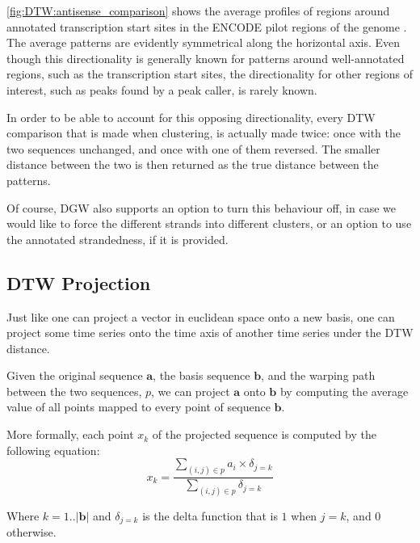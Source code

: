 \documentclass[parskip]{cs4rep}
\begin{document}
\autoref{fig:DTW:antisense_comparison} shows the average profiles of regions around annotated transcription start sites in the ENCODE pilot regions of the genome \cite{ENCODEProjectConsortium:2007fu}. The average patterns are evidently symmetrical along the horizontal axis.
Even though this directionality is generally known for patterns around well-annotated regions, such as the transcription start sites, the directionality for other regions of interest, such as peaks found by a peak caller, is rarely known.  

In order to be able to account for this opposing directionality, every DTW comparison that is made when clustering, is actually made twice: once with the two sequences unchanged, and once with one of them reversed. The smaller distance between the two is then returned as the true distance between the patterns. 

Of course, DGW also supports an option to turn this behaviour off, in case we would like to force the different strands into different clusters, or an option to use the annotated strandedness, if it is provided.

\subsection{DTW Projection}
\label{sec:dtw-projection}

Just like one can project a vector in euclidean space onto a new basis, one can project some time series onto the time axis of another time series under the DTW distance.

Given the original sequence $\mathbf{a}$, the basis sequence $\mathbf{b}$, and the warping path between the two sequences, $p$, we can project $\mathbf{a}$ onto $\mathbf{b}$ by computing the average value of all points mapped to every point of sequence $\mathbf{b}$.

More formally, each point $x_k$ of the projected sequence is computed by the following equation:
\begin{equation}
    x_k =  \frac{\sum_{(i,j) \in p} a_i \times \delta_{j=k}}{\sum_{(i,j) \in p} \delta_{j=k}} 
\end{equation}

Where $k=1..|\mathbf{b}|$ and $\delta_{j=k}$ is the delta function that is $1$ when $j=k$, and $0$ otherwise.
\end{document}
